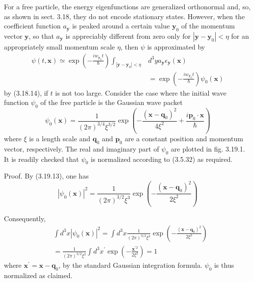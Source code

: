 \documentclass{article}
\begin{document}
For a free particle, the energy eigenfunctions are generalized orthonormal and, so, as shown in sect. 3.18, they do not encode stationary states. However, when the coefficient function $a_{\boldsymbol{y}}$ is peaked around a certain value $\boldsymbol{y}_{0}$ of the momentum vector $\boldsymbol{y}$, so that $a_{\boldsymbol{y}}$ is appreciably different from zero only for $\left|\boldsymbol{y}-\boldsymbol{y}_{0}\right|<\eta$ for an appropriately small momentum scale $\eta$, then $\psi$ is approximated by
$$
\begin{align*}
\psi(t, \boldsymbol{x}) \simeq \exp \left(-\frac{i w_{\boldsymbol{y}_{0}} t}{\hbar}\right) \int_{\left|\boldsymbol{y}-\boldsymbol{y}_{0}\right|<\eta} & d^{3} y a_{\boldsymbol{y}} \epsilon_{\boldsymbol{y}}(\boldsymbol{x})  \tag{3.19.12}\\
& =\exp \left(-\frac{i w_{\boldsymbol{y}_{0}} t}{\hbar}\right) \psi_{0}(\boldsymbol{x})
\end{align*}
$$
by (3.18.14), if $t$ is not too large.
Consider the case where the initial wave function $\psi_{0}$ of the free particle is the Gaussian wave packet
$$
\begin{equation*}
\psi_{0}(\boldsymbol{x})=\frac{1}{(2 \pi)^{3 / 4} \xi^{3 / 2}} \exp \left(-\frac{\left(\boldsymbol{x}-\boldsymbol{q}_{0}\right)^{2}}{4 \xi^{2}}+\frac{i \boldsymbol{p}_{0} \cdot \boldsymbol{x}}{\hbar}\right) \tag{3.19.13}
\end{equation*}
$$
where $\xi$ is a length scale and $\boldsymbol{q}_{0}$ and $\boldsymbol{p}_{0}$ are a constant position and momentum vector, respectively. The real and imaginary part of $\psi_{0}$ are plotted in fig. 3.19.1. It is readily checked that $\psi_{0}$ is normalized according to (3.5.32) as required.

Proof. By (3.19.13), one has
$$
\begin{equation*}
\left|\psi_{0}(\boldsymbol{x})\right|^{2}=\frac{1}{(2 \pi)^{3 / 2} \xi^{3}} \exp \left(-\frac{\left(\boldsymbol{x}-\boldsymbol{q}_{0}\right)^{2}}{2 \xi^{2}}\right) \tag{3.19.14}
\end{equation*}
$$

Consequently,
$$
\begin{align*}
& \int d^{3} x\left|\psi_{0}(\boldsymbol{x})\right|^{2}=\int d^{3} x \frac{1}{(2 \pi)^{3 / 2} \xi^{3}} \exp \left(-\frac{\left(\boldsymbol{x}-\boldsymbol{q}_{0}\right)^{2}}{2 \xi^{2}}\right)  \tag{3.19.15}\\
&=\frac{1}{(2 \pi)^{3 / 2} \xi^{3}} \int d^{3} x^{\prime} \exp \left(-\frac{\boldsymbol{x}^{\prime 2}}{2 \xi^{2}}\right)=1
\end{align*}
$$
where $\boldsymbol{x}^{\prime}=\boldsymbol{x}-\boldsymbol{q}_{0}$, by the standard Gaussian integration formula. $\psi_{0}$ is thus normalized as claimed.
\end{document}
